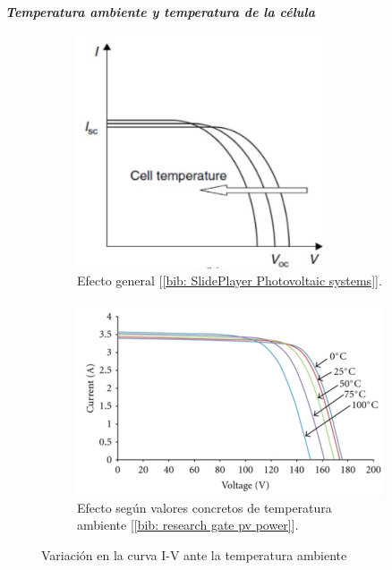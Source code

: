 \documentclass[12pt]{article}
\begin{document}
	\pagebreak
	
	\noindent \textit{\textbf{Temperatura ambiente y temperatura de la célula}} \\
	
	\begin{figure}[h]
		\begin{subfigure}{0.45\textwidth}
			\includegraphics[width=0.8\textwidth]{img/generalEffect_celTempIVcurve_solarCell.png} 
			\caption{Efecto general [\ref{bib: SlidePlayer Photovoltaic systems}].}
			\label{fig: variación general en la curva I-V de una célula PV con la temperatura.}
		\end{subfigure}
		\begin{subfigure}{0.55\textwidth}
			\includegraphics[width=1\linewidth]{img/concreteEffect_TempIVcurve_solarCell.png}
			\caption{Efecto según valores concretos de temperatura ambiente [\ref{bib: research gate pv power}].}
			\label{fig:variación con valores en la curva I-V de una célula PV con la temperatura.}
		\end{subfigure}
		\caption{Variación en la curva I-V ante la temperatura ambiente}
		\label{fig:variación I-V temperatura}
	\end{figure}
	
\end{document}
